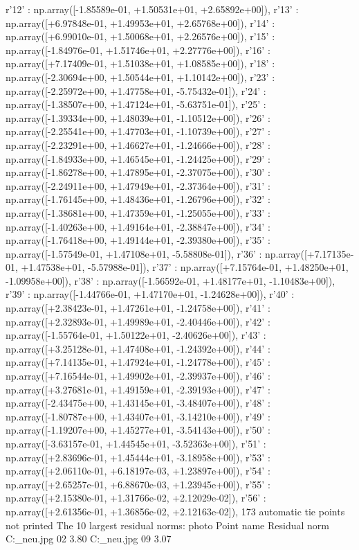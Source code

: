 r'12' : np.array([-1.85589e-01, +1.50531e+01, +2.65892e+00]),
r'13' : np.array([+6.97848e-01, +1.49953e+01, +2.65768e+00]),
r'14' : np.array([+6.99010e-01, +1.50068e+01, +2.26576e+00]),
r'15' : np.array([-1.84976e-01, +1.51746e+01, +2.27776e+00]),
r'16' : np.array([+7.17409e-01, +1.51038e+01, +1.08585e+00]),
r'18' : np.array([-2.30694e+00, +1.50544e+01, +1.10142e+00]),
r'23' : np.array([-2.25972e+00, +1.47758e+01, -5.75432e-01]),
r'24' : np.array([-1.38507e+00, +1.47124e+01, -5.63751e-01]),
r'25' : np.array([-1.39334e+00, +1.48039e+01, -1.10512e+00]),
r'26' : np.array([-2.25541e+00, +1.47703e+01, -1.10739e+00]),
r'27' : np.array([-2.23291e+00, +1.46627e+01, -1.24666e+00]),
r'28' : np.array([-1.84933e+00, +1.46545e+01, -1.24425e+00]),
r'29' : np.array([-1.86278e+00, +1.47895e+01, -2.37075e+00]),
r'30' : np.array([-2.24911e+00, +1.47949e+01, -2.37364e+00]),
r'31' : np.array([-1.76145e+00, +1.48436e+01, -1.26796e+00]),
r'32' : np.array([-1.38681e+00, +1.47359e+01, -1.25055e+00]),
r'33' : np.array([-1.40263e+00, +1.49164e+01, -2.38847e+00]),
r'34' : np.array([-1.76418e+00, +1.49144e+01, -2.39380e+00]),
r'35' : np.array([-1.57549e-01, +1.47108e+01, -5.58808e-01]),
r'36' : np.array([+7.17135e-01, +1.47538e+01, -5.57988e-01]),
r'37' : np.array([+7.15764e-01, +1.48250e+01, -1.09958e+00]),
r'38' : np.array([-1.56592e-01, +1.48177e+01, -1.10483e+00]),
r'39' : np.array([-1.44766e-01, +1.47170e+01, -1.24628e+00]),
r'40' : np.array([+2.38423e-01, +1.47261e+01, -1.24758e+00]),
r'41' : np.array([+2.32893e-01, +1.49989e+01, -2.40446e+00]),
r'42' : np.array([-1.55764e-01, +1.50122e+01, -2.40626e+00]),
r'43' : np.array([+3.25128e-01, +1.47408e+01, -1.24392e+00]),
r'44' : np.array([+7.14135e-01, +1.47924e+01, -1.24778e+00]),
r'45' : np.array([+7.16544e-01, +1.49902e+01, -2.39937e+00]),
r'46' : np.array([+3.27681e-01, +1.49159e+01, -2.39193e+00]),
r'47' : np.array([-2.43475e+00, +1.43145e+01, -3.48407e+00]),
r'48' : np.array([-1.80787e+00, +1.43407e+01, -3.14210e+00]),
r'49' : np.array([-1.19207e+00, +1.45277e+01, -3.54143e+00]),
r'50' : np.array([-3.63157e-01, +1.44545e+01, -3.52363e+00]),
r'51' : np.array([+2.83696e-01, +1.45444e+01, -3.18958e+00]),
r'53' : np.array([+2.06110e-01, +6.18197e-03, +1.23897e+00]),
r'54' : np.array([+2.65257e-01, +6.88670e-03, +1.23945e+00]),
r'55' : np.array([+2.15380e-01, +1.31766e-02, +2.12029e-02]),
r'56' : np.array([+2.61356e-01, +1.36856e-02, +2.12163e-02]),
173 automatic tie points not printed
The 10 largest residual norms:
photo	Point name	Residual norm
C:\Users\Clemens\Desktop\fotos_neu\1.jpg	02	3.80
C:\Users\Clemens\Desktop\fotos_neu\4.jpg	09	3.07
